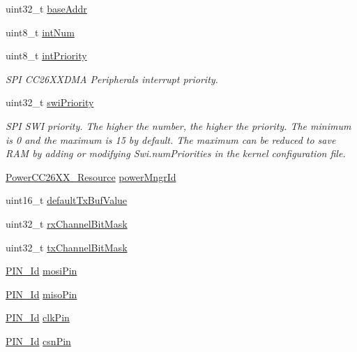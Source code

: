 \begin{DoxyCompactItemize}
\item 
uint32\+\_\+t \hyperlink{struct_s_p_i_c_c26_x_x_d_m_a___h_w_attrs_v1_a9599bdd7fa7cd54ba21abd1620ff9b7c}{base\+Addr}
\item 
uint8\+\_\+t \hyperlink{struct_s_p_i_c_c26_x_x_d_m_a___h_w_attrs_v1_acd8e80fe8f87b4dd9dc2c4dd67154b4f}{int\+Num}
\item 
uint8\+\_\+t \hyperlink{struct_s_p_i_c_c26_x_x_d_m_a___h_w_attrs_v1_adf00bea7af47e0a9710abbb678f2a5d3}{int\+Priority}
\begin{DoxyCompactList}\small\item\em S\+P\+I C\+C26\+X\+X\+D\+M\+A Peripheral\textquotesingle{}s interrupt priority. \end{DoxyCompactList}\item 
uint32\+\_\+t \hyperlink{struct_s_p_i_c_c26_x_x_d_m_a___h_w_attrs_v1_ae85e096957fdda594aef03bd11f3ecc9}{swi\+Priority}
\begin{DoxyCompactList}\small\item\em S\+P\+I S\+W\+I priority. The higher the number, the higher the priority. The minimum is 0 and the maximum is 15 by default. The maximum can be reduced to save R\+A\+M by adding or modifying Swi.\+num\+Priorities in the kernel configuration file. \end{DoxyCompactList}\item 
\hyperlink{_power_c_c26_x_x_8h_a2e11676879f87f39c099719d717dd04e}{Power\+C\+C26\+X\+X\+\_\+\+Resource} \hyperlink{struct_s_p_i_c_c26_x_x_d_m_a___h_w_attrs_v1_abb44579acb05087acf70a9f0f9b07a32}{power\+Mngr\+Id}
\item 
uint16\+\_\+t \hyperlink{struct_s_p_i_c_c26_x_x_d_m_a___h_w_attrs_v1_a174e951d2fbfe1336e169146e4719cb3}{default\+Tx\+Buf\+Value}
\item 
uint32\+\_\+t \hyperlink{struct_s_p_i_c_c26_x_x_d_m_a___h_w_attrs_v1_ab398cf4aa44a1856c8b8b2d874e838e4}{rx\+Channel\+Bit\+Mask}
\item 
uint32\+\_\+t \hyperlink{struct_s_p_i_c_c26_x_x_d_m_a___h_w_attrs_v1_a79459502de9e2ce20c4151a6ceb987f3}{tx\+Channel\+Bit\+Mask}
\item 
\hyperlink{_p_i_n_8h_a9ae8197f460bb76ea09a84f47d09921f}{P\+I\+N\+\_\+\+Id} \hyperlink{struct_s_p_i_c_c26_x_x_d_m_a___h_w_attrs_v1_aa67bd42df961080c01653b99a4d475a0}{mosi\+Pin}
\item 
\hyperlink{_p_i_n_8h_a9ae8197f460bb76ea09a84f47d09921f}{P\+I\+N\+\_\+\+Id} \hyperlink{struct_s_p_i_c_c26_x_x_d_m_a___h_w_attrs_v1_a420ee9fc74e0a5c86f5461ecea484bbe}{miso\+Pin}
\item 
\hyperlink{_p_i_n_8h_a9ae8197f460bb76ea09a84f47d09921f}{P\+I\+N\+\_\+\+Id} \hyperlink{struct_s_p_i_c_c26_x_x_d_m_a___h_w_attrs_v1_adcdbba63f9164524601115195754ccaa}{clk\+Pin}
\item 
\hyperlink{_p_i_n_8h_a9ae8197f460bb76ea09a84f47d09921f}{P\+I\+N\+\_\+\+Id} \hyperlink{struct_s_p_i_c_c26_x_x_d_m_a___h_w_attrs_v1_ae6f53f93617b30ba7a3026cac95822e3}{csn\+Pin}
\end{DoxyCompactItemize}


